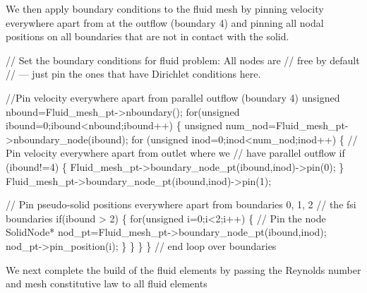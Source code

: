 We then apply boundary conditions to the fluid mesh by pinning velocity everywhere apart from at the outflow (boundary 4) and pinning all nodal positions on all boundaries that are not in contact with the solid.


\begin{DoxyCodeInclude}

 \textcolor{comment}{// Set the boundary conditions for fluid problem: All nodes are}
 \textcolor{comment}{// free by default }
 \textcolor{comment}{// --- just pin the ones that have Dirichlet conditions here. }

 \textcolor{comment}{//Pin velocity everywhere apart from parallel outflow (boundary 4)}
 \textcolor{keywordtype}{unsigned} nbound=Fluid\_mesh\_pt->nboundary();
 \textcolor{keywordflow}{for}(\textcolor{keywordtype}{unsigned} ibound=0;ibound<nbound;ibound++)
  \{
   \textcolor{keywordtype}{unsigned} num\_nod=Fluid\_mesh\_pt->nboundary\_node(ibound);
   \textcolor{keywordflow}{for} (\textcolor{keywordtype}{unsigned} inod=0;inod<num\_nod;inod++)
    \{
     \textcolor{comment}{// Pin velocity everywhere apart from outlet where we}
     \textcolor{comment}{// have parallel outflow}
     \textcolor{keywordflow}{if} (ibound!=4)
      \{
       Fluid\_mesh\_pt->boundary\_node\_pt(ibound,inod)->pin(0); 
      \}
     Fluid\_mesh\_pt->boundary\_node\_pt(ibound,inod)->pin(1); 

     \textcolor{comment}{// Pin pseudo-solid positions everywhere apart from boundaries 0, 1, 2 }
     \textcolor{comment}{// the fsi boundaries}
     \textcolor{keywordflow}{if}(ibound > 2)
      \{
       \textcolor{keywordflow}{for}(\textcolor{keywordtype}{unsigned} i=0;i<2;i++)
        \{
         \textcolor{comment}{// Pin the node}
         SolidNode* nod\_pt=Fluid\_mesh\_pt->boundary\_node\_pt(ibound,inod);
         nod\_pt->pin\_position(i);
        \}
      \}
    \}
  \} \textcolor{comment}{// end loop over boundaries}

\end{DoxyCodeInclude}


We next complete the build of the fluid elements by passing the Reynolds number and mesh constitutive law to all fluid elements


